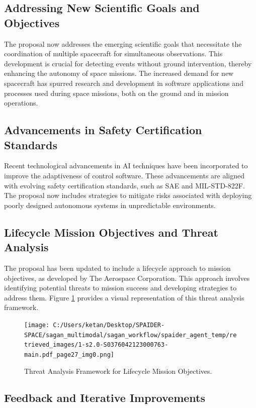 \documentclass[a4paper, 11pt]{article}
\begin{document}
\subsection{Addressing New Scientific Goals and Objectives}

The proposal now addresses the emerging scientific goals that necessitate the coordination of multiple spacecraft for simultaneous observations. This development is crucial for detecting events without ground intervention, thereby enhancing the autonomy of space missions. The increased demand for new spacecraft has spurred research and development in software applications and processes used during space missions, both on the ground and in mission operations.

\subsection{Advancements in Safety Certification Standards}

Recent technological advancements in AI techniques have been incorporated to improve the adaptiveness of control software. These advancements are aligned with evolving safety certification standards, such as SAE and MIL-STD-822F. The proposal now includes strategies to mitigate risks associated with deploying poorly designed autonomous systems in unpredictable environments.

\subsection{Lifecycle Mission Objectives and Threat Analysis}

The proposal has been updated to include a lifecycle approach to mission objectives, as developed by The Aerospace Corporation. This approach involves identifying potential threats to mission success and developing strategies to address them. Figure \ref{fig:threat_analysis} provides a visual representation of this threat analysis framework.

\begin{figure}[htbp]
    \centering
    \texttt{[image: C:/Users/ketan/Desktop/SPAIDER-SPACE/sagan\_multimodal/sagan\_workflow/spaider\_agent\_temp/retrieved\_images/1-s2.0-S0376042123000763-main.pdf\_page27\_img0.png]}
    \caption{Threat Analysis Framework for Lifecycle Mission Objectives.}
    \label{fig:threat_analysis}
\end{figure}

\subsection{Feedback and Iterative Improvements}
\end{document}
